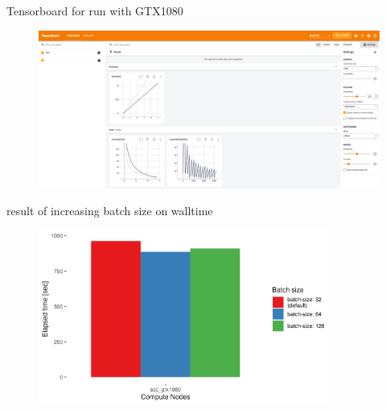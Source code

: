 \documentclass[compress,aspectratio=169]{beamer}
\begin{document}
\begin{frame}{Tensorboard for run with GTX1080}

\begin{center}
    \begin{figure}
        \includegraphics[width=1\textwidth]{../../data/scap_gtx1080_tensorboard_14615343}
    \end{figure}
    \end{center}

\end{frame}

\begin{frame}{result of increasing batch size on walltime}
    \vspace{-1em}
    \begin{center}
        \begin{figure}
            \includegraphics[width=0.85\textwidth]{../../data/sacct_barplot_by_nodes_batch-size-effect}

        \end{figure}
    \end{center}
\end{frame}
\end{document}
